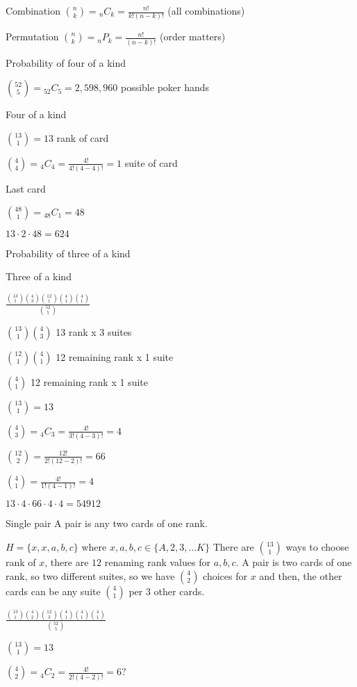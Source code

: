 \documentclass{article}
\newcommand*{\Comb}[2]{{}_{#1}C_{#2}}%
\newcommand*{\Perm}[2]{{}_{#1}\!P_{#2}}%
\begin{document}
  

Combination $\binom{n}{k} = \Comb{n}{k} = \frac{n!}{k!(n-k)!}$ (all combinations)

Permutation $\binom{n}{k} = \Perm{n}{k} = \frac{n!}{(n-k)!}$ (order matters)


Probability of four of a kind

$\binom{52}{5} = \Comb{52}{5} = 2,598,960$ possible poker hands

Four of a kind

$\binom{13}{1} = 13 $ rank of card

$\binom{4}{4} = \Comb{4}{4} = \frac{4!}{4!(4-4)!} = 1$ suite of card

Last card

$\binom{48}{1} = \Comb{48}{1} = 48$

$13 \cdot 2 \cdot 48 = 624$


Probability of three of a kind

Three of a kind

$\frac{\binom{13}{1}\binom{4}{3}\binom{12}{1}\binom{4}{1}\binom{4}{1}}{\binom{52}{5}}$

$\binom{13}{1}\binom{4}{3}$ 13 rank x 3 suites

$\binom{12}{1}\binom{4}{1}$ 12 remaining rank x 1 suite

$\binom{4}{1}$ 12 remaining rank x 1 suite

$\binom{13}{1} = 13$

$\binom{4}{3} = \Comb{4}{3} = \frac{4!}{3!(4-3)!} = 4$

$\binom{12}{2} = \frac{12!}{2!(12-2)!} = 66$

$\binom{4}{1} = \frac{4!}{1!(4-1)!} = 4$

$13 \cdot 4 \cdot 66 \cdot 4 \cdot 4 = 54912$

Single pair
A pair is any two cards of one rank. 

$H = \{x,x,a,b,c\}$ where $x,a,b,c \in \{A, 2, 3, ... K\}$
There are $\binom{13}{1}$ ways to choose rank of $x$, there are $12$ renaming rank values for $a, b, c$. A pair is two cards of one rank, so two different suites, so we have $\binom{4}{2}$ choices for $x$ and then, the other cards can be any suite $\binom{4}{1}$ per 3 other cards. 

$\frac{\binom{13}{1}\binom{4}{2}\binom{12}{3}\binom{4}{1}\binom{4}{1}\binom{4}{1}}{\binom{52}{5}}$

$\binom{13}{1} = 13$

$\binom{4}{2} = \Comb{4}{2} = \frac{4!}{2!(4-2)!} = 6 ?$
\end{document}
